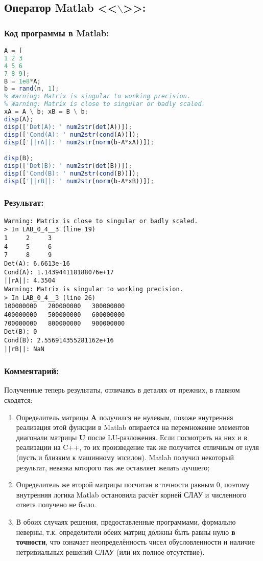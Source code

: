 \subsection{Оператор Matlab <<$\backslash$>>:}
\subsubsection{Код программы в Matlab:}
\begin{lstlisting}[language=octave]
A = [
1 2 3
4 5 6
7 8 9];
B = 1e8*A;
b = rand(n, 1);
% Warning: Matrix is singular to working precision.
% Warning: Matrix is close to singular or badly scaled.
xA = A \ b; xB = B \ b;
disp(A);
disp(['Det(A): ' num2str(det(A))]);
disp(['Cond(A): ' num2str(cond(A))]);
disp(['||rA||: ' num2str(norm(b-A*xA))]);

disp(B);
disp(['Det(B): ' num2str(det(B))]);
disp(['Cond(B): ' num2str(cond(B))]);
disp(['||rB||: ' num2str(norm(b-A*xB))]);
\end{lstlisting}
\subsubsection{Результат:}
{\singlespacing
\begin{verbatim}
Warning: Matrix is close to singular or badly scaled.
> In LAB_0_4__3 (line 19)
1     2     3
4     5     6
7     8     9
Det(A): 6.6613e-16
Cond(A): 1.143944118188076e+17
||rA||: 4.3504
Warning: Matrix is singular to working precision.
> In LAB_0_4__3 (line 26)
100000000   200000000   300000000
400000000   500000000   600000000
700000000   800000000   900000000
Det(B): 0
Cond(B): 2.556914355281162e+16
||rB||: NaN
\end{verbatim}}
\subsubsection{Комментарий:}
Полученные теперь результаты, отличаясь в деталях от прежних, в главном сходятся:
\begin{enumerate}
    \item Определитель матрицы $\mathbf{A}$ получился не нулевым, похоже внутренняя реализация этой функции в Matlab опирается на перемножение элементов диагонали матрицы $\mathbf{U}$ после LU-разложения. Если посмотреть на них и в реализации на C++, то их произведение так же получится отличным от нуля (пусть и близким к машинному эпсилон). Matlab получил некоторый результат, невязка которого так же оставляет желать лучшего;

    \item Определитель же второй матрицы посчитан в точности равным 0, поэтому внутренняя логика Matlab остановила расчёт корней СЛАУ и численного ответа получено не было.

    \item В обоих случаях решения, предоставленные программами, формально неверны, т.к. определители обеих матриц должны быть равны нулю {\bf в точности}, что означает неопределённость чисел обусловленности и наличие нетривиальных решений СЛАУ (или их полное отсутствие).
\end{enumerate}

